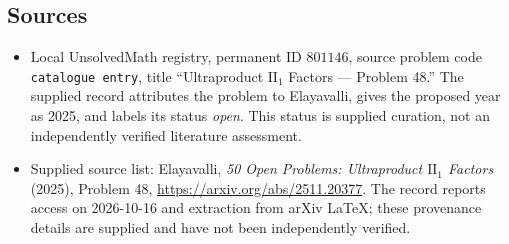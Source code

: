\documentclass[11pt]{article}
\begin{document}
\subsection{Sources}
\begin{itemize}
\item Local UnsolvedMath registry, permanent ID \(801146\), source problem code \texttt{catalogue entry}, title ``Ultraproduct \(\mathrm{II}_1\) Factors --- Problem 48.'' The supplied record attributes the problem to Elayavalli, gives the proposed year as 2025, and labels its status \emph{open}. This status is supplied curation, not an independently verified literature assessment.
\item Supplied source list: Elayavalli, \emph{50 Open Problems: Ultraproduct \(\mathrm{II}_1\) Factors} (2025), Problem 48, \url{https://arxiv.org/abs/2511.20377}. The record reports access on 2026-10-16 and extraction from arXiv LaTeX; these provenance details are supplied and have not been independently verified.
\end{itemize}
\end{document}
